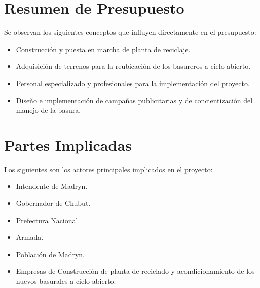 \documentclass[a4paper,11pt]{article}
\begin{document}
\section{Resumen de Presupuesto}

Se observan los siguientes conceptos que influyen directamente en el
presupuesto:

\begin{itemize}

  \item Construcción y puesta en marcha de planta de reciclaje.

  \item Adquisición de terrenos para la reubicación de los basureros a cielo
    abierto.

  \item Personal especializado y profesionales para la implementación del
    proyecto.

  \item Diseño e implementación de campañas publicitarias y de concientización
    del manejo de la basura.

\end{itemize}

\section{Partes Implicadas}

Los siguientes son los actores principales implicados en el proyecto:

\begin{itemize}

  \item Intendente de Madryn.

  \item Gobernador de Chubut.

  \item Prefectura Nacional.

  \item Armada.

  \item Población de Madryn.

  \item Empresas de Construcción de planta de reciclado y acondicionamiento de
    los nuevos basurales a cielo abierto.

\end{itemize}
\end{document}
